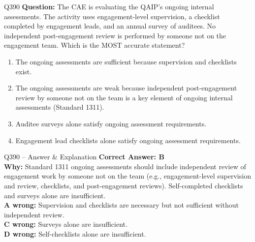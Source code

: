 \documentclass[aspectratio=169,10pt]{beamer}
\begin{document}
	\begin{frame}[t]{Q390}
		\small
		\textbf{Question:} The CAE is evaluating the QAIP's ongoing internal assessments. The activity uses engagement-level supervision, a checklist completed by engagement leads, and an annual survey of auditees. No independent post-engagement review is performed by someone not on the engagement team. Which is the MOST accurate statement?
		\begin{enumerate}[label=\Alph*.,itemsep=1pt,topsep=2pt]
			\item The ongoing assessments are sufficient because supervision and checklists exist.
			\item The ongoing assessments are weak because independent post-engagement review by someone not on the team is a key element of ongoing internal assessments (Standard 1311).
			\item Auditee surveys alone satisfy ongoing assessment requirements.
			\item Engagement lead checklists alone satisfy ongoing assessment requirements.
		\end{enumerate}
	\end{frame}
	
	\begin{frame}[t]{Q390 -- Answer \& Explanation}
		\small
		\textbf{Correct Answer: B} \\[4pt]
		\textbf{Why:} Standard 1311 ongoing assessments should include independent review of engagement work by someone not on the team (e.g., engagement-level supervision and review, checklists, and post-engagement reviews). Self-completed checklists and surveys alone are insufficient. \\[4pt]
		\textbf{A wrong:} Supervision and checklists are necessary but not sufficient without independent review. \\[2pt]
		\textbf{C wrong:} Surveys alone are insufficient. \\[2pt]
		\textbf{D wrong:} Self-checklists alone are insufficient.
	\end{frame}
	
\end{document}

